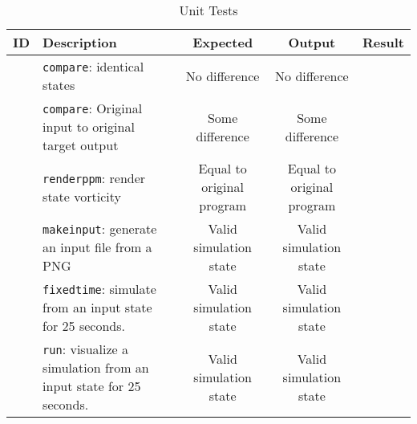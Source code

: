 
\newcommand{\testsuccess}{\cmark{}}
\newcommand{\testfail}{\xmark{}}


\begin{sidewaystable}
    \centering
    \begin{tabular}{ll|c|c|c}
        ID & Description & Expected & Output & Result \\
        \hline
        \newtest{}\label{test:unit:compare:identical} & \texttt{compare}: identical states & No difference & No difference & \testsuccess{} \\
        \newtest{}\label{test:unit:compare:different} & \texttt{compare}: Original input to original target output & Some difference & Some difference & \testsuccess{} \\
        \newtest{}\label{test:unit:renderppm} & \texttt{renderppm}: render state vorticity & Equal to original program & Equal to original program & \testsuccess{} \\
        \newtest{}\label{test:unit:makeinput} & \texttt{makeinput}: generate an input file from a PNG & Valid simulation state & Valid simulation state & \testsuccess{} \\
        \newtest{}\label{test:unit:fixedtime} & \texttt{fixedtime}: simulate from an input state for 25 seconds. & Valid simulation state & Valid simulation state & \testsuccess{} \\
        \newtest{}\label{test:unit:run} & \texttt{run}: visualize a simulation from an input state for 25 seconds. & Valid simulation state & Valid simulation state & \testsuccess{} \\
    \end{tabular}
    \caption{Unit Tests}
    \label{tab:unittests}
\end{sidewaystable}
